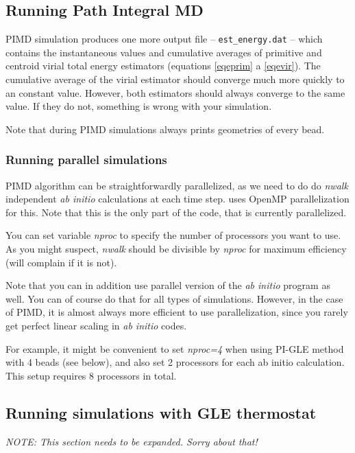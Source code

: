 \subsection{Running Path Integral MD}

PIMD simulation produces one more output file -- \texttt{est\_energy.dat} -- which contains the instantaneous values and cumulative averages of primitive and centroid virial total energy estimators (equations \ref{eqeprim} a \ref{eqevir}). The cumulative average of the virial estimator should converge much more quickly to an constant value. However, both estimators should always converge to the same value. If they do not, something is wrong with your simulation.

Note that during PIMD simulations \abin always prints geometries of every bead.

\subsubsection{Running parallel simulations}

PIMD algorithm can be straightforwardly parallelized, as we need to do do \textit{nwalk} independent \textit{ab initio} calculations at each time step.
\abin uses OpenMP parallelization for this. Note that this is the only part of the code, that is currently parallelized.

You can set variable \textit{nproc} to specify the number of processors you want to use. As you might suspect, \textit{nwalk} should be divisible by \textit{nproc} for maximum efficiency (\abin will complain if it is not).

Note that you can in addition use parallel version of the \textit{ab initio} program as well. You can of course do that for all types of simulations. However, in the case of PIMD, it is almost always more efficient to use \abin parallelization, since you rarely get perfect linear scaling in \textit{ab initio} codes.

For example, it might be convenient to set \textit{nproc=4} when using PI-GLE method with 4 beads (see below), and also set 2 processors for each ab initio calculation. This setup requires 8 processors in total.

\subsection{Running simulations with GLE thermostat}
\textit{NOTE: This section needs to be expanded. Sorry about that! 
}

